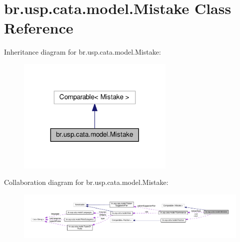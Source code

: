 \hypertarget{classbr_1_1usp_1_1cata_1_1model_1_1_mistake}{\section{br.\+usp.\+cata.\+model.\+Mistake Class Reference}
\label{classbr_1_1usp_1_1cata_1_1model_1_1_mistake}
}


Inheritance diagram for br.\+usp.\+cata.\+model.\+Mistake\+:\nopagebreak
\begin{figure}[H]
\begin{center}
\leavevmode
\includegraphics[width=212pt]{classbr_1_1usp_1_1cata_1_1model_1_1_mistake__inherit__graph}
\end{center}
\end{figure}


Collaboration diagram for br.\+usp.\+cata.\+model.\+Mistake\+:\nopagebreak
\begin{figure}[H]
\begin{center}
\leavevmode
\includegraphics[width=350pt]{classbr_1_1usp_1_1cata_1_1model_1_1_mistake__coll__graph}
\end{center}
\end{figure}
